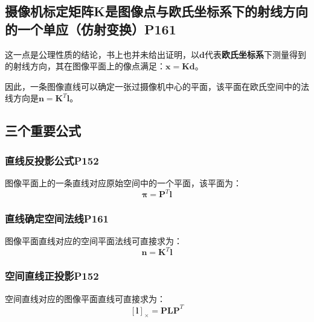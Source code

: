 \documentclass[11pt]{article}
\begin{document}
\subsection{摄像机标定矩阵K是图像点与欧氏坐标系下的射线方向的一个单应（仿射变换）P161}
这一点是公理性质的结论，书上也并未给出证明，以$\mathbold{d}$代表\textbf{欧氏坐标系}下测量得到的射线方向，其在图像平面上的像点满足：$\mathbold{x=Kd}$。\par
因此，一条图像直线可以确定一张过摄像机中心的平面，该平面在欧氏空间中的法线方向是$\mathbold{n=K}^T\mathbold{l}$。
\subsection{三个重要公式}
\subsubsection{直线反投影公式P152}
图像平面上的一条直线对应原始空间中的一个平面，该平面为：
\begin{equation*}
  \mathbold{\pi}=\mathbold{P}^T\mathbold{l}
\end{equation*}
\subsubsection{直线确定空间法线P161}
图像平面直线对应的空间平面法线可直接求为：
\begin{equation*}
  \mathbold{n}=\mathbold{K}^T\mathbold{l}
\end{equation*}
\subsubsection{空间直线正投影P152}
空间直线对应的图像平面直线可直接求为：
\begin{equation*}
  \mathbold{[l]_\times}=\mathbold{P}\mathbold{LP}^T
\end{equation*}
\end{document}
